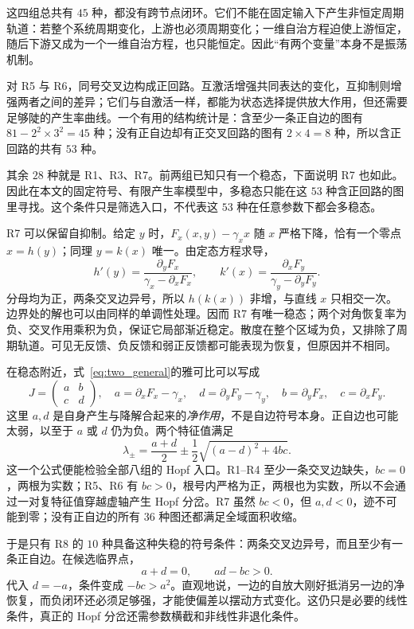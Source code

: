 这四组总共有 $45$ 种，都没有跨节点闭环。它们不能在固定输入下产生非恒定周期轨道：若整个系统周期变化，上游也必须周期变化；一维自治方程迫使上游恒定，随后下游又成为一个一维自治方程，也只能恒定。因此“有两个变量”本身不是振荡机制。

对 R5 与 R6，同号交叉边构成正回路。互激活增强共同表达的变化，互抑制则增强两者之间的差异；它们与自激活一样，都能为状态选择提供放大作用，但还需要足够陡的产生率曲线。一个有用的结构统计是：含至少一条正自边的图有 $81-2^2\times3^2=45$ 种；没有正自边却有正交叉回路的图有 $2\times4=8$ 种，所以含正回路的共有 $53$ 种。

其余 $28$ 种就是 R1、R3、R7。前两组已知只有一个稳态，下面说明 R7 也如此。因此在本文的固定符号、有限产生率模型中，多稳态只能在这 $53$ 种含正回路的图里寻找。这个条件只是筛选入口，不代表这 $53$ 种在任意参数下都会多稳态。

R7 可以保留自抑制。给定 $y$ 时，$F_x(x,y)-\gamma_xx$ 随 $x$ 严格下降，恰有一个零点 $x=h(y)$；同理 $y=k(x)$ 唯一。由定态方程求导，
\[
h'(y)=\frac{\partial_yF_x}{\gamma_x-\partial_xF_x},\qquad
k'(x)=\frac{\partial_xF_y}{\gamma_y-\partial_yF_y}.
\]
分母均为正，两条交叉边异号，所以 $h(k(x))$ 非增，与直线 $x$ 只相交一次。边界处的解也可以由同样的单调性处理。因而 R7 有唯一稳态；两个对角恢复率为负、交叉作用乘积为负，保证它局部渐近稳定。散度在整个区域为负，又排除了周期轨道。可见无反馈、负反馈和弱正反馈都可能表现为恢复，但原因并不相同。


在稳态附近，式~\eqref{eq:two_general}的雅可比可以写成
\[
J=\begin{pmatrix}a&b\\c&d\end{pmatrix},\quad
 a=\partial_xF_x-\gamma_x,\quad d=\partial_yF_y-\gamma_y,
\quad b=\partial_yF_x,\quad c=\partial_xF_y.
\]
这里 $a,d$ 是自身产生与降解合起来的\emph{净作用}，不是自边符号本身。正自边也可能太弱，以至于 $a$ 或 $d$ 仍为负。两个特征值满足
\[
\lambda_{\pm}=\frac{a+d}{2}\pm\frac12\sqrt{(a-d)^2+4bc}.
\]
这一个公式便能检验全部八组的 Hopf 入口。R1--R4 至少一条交叉边缺失，$bc=0$，两根为实数；R5、R6 有 $bc>0$，根号内严格为正，两根也为实数，所以不会通过一对复特征值穿越虚轴产生 Hopf 分岔。R7 虽然 $bc<0$，但 $a,d<0$，迹不可能到零；没有正自边的所有 $36$ 种图还都满足全域面积收缩。

于是只有 R8 的 $10$ 种具备这种失稳的符号条件：两条交叉边异号，而且至少有一条正自边。在候选临界点，
\[
a+d=0,\qquad ad-bc>0.
\]
代入 $d=-a$，条件变成 $-bc>a^2$。直观地说，一边的自放大刚好抵消另一边的净恢复，而负闭环还必须足够强，才能使偏差以摆动方式变化。这仍只是必要的线性条件，真正的 Hopf 分岔还需参数横截和非线性非退化条件。

